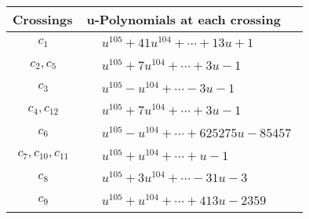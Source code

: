 \documentclass[1p]{elsarticle_modified}
\theoremstyle{definition}
\begin{document}
\begin{tabular}{m{50pt}|m{274pt}}
Crossings & \hspace{64pt}u-Polynomials at each crossing \\
\hline $$\begin{aligned}c_{1}\end{aligned}$$&$\begin{aligned}
&u^{105}+41 u^{104}+\cdots+13 u+1
\end{aligned}$\\
\hline $$\begin{aligned}c_{2},c_{5}\end{aligned}$$&$\begin{aligned}
&u^{105}+7 u^{104}+\cdots+3 u-1
\end{aligned}$\\
\hline $$\begin{aligned}c_{3}\end{aligned}$$&$\begin{aligned}
&u^{105}- u^{104}+\cdots-3 u-1
\end{aligned}$\\
\hline $$\begin{aligned}c_{4},c_{12}\end{aligned}$$&$\begin{aligned}
&u^{105}+7 u^{104}+\cdots+3 u-1
\end{aligned}$\\
\hline $$\begin{aligned}c_{6}\end{aligned}$$&$\begin{aligned}
&u^{105}- u^{104}+\cdots+625275 u-85457
\end{aligned}$\\
\hline $$\begin{aligned}c_{7},c_{10},c_{11}\end{aligned}$$&$\begin{aligned}
&u^{105}+u^{104}+\cdots+u-1
\end{aligned}$\\
\hline $$\begin{aligned}c_{8}\end{aligned}$$&$\begin{aligned}
&u^{105}+3 u^{104}+\cdots-31 u-3
\end{aligned}$\\
\hline $$\begin{aligned}c_{9}\end{aligned}$$&$\begin{aligned}
&u^{105}+u^{104}+\cdots+413 u-2359
\end{aligned}$\\
\hline
\end{tabular}\\~\\
\end{document}
